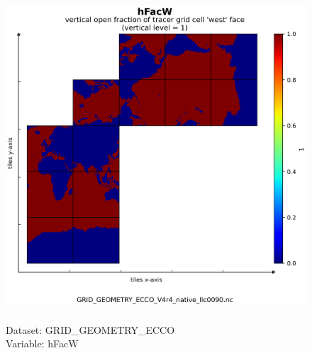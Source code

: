 \begin{figure}[H]
\centering
\includegraphics[scale=0.5]{../images/plots/native_plots_coords/Geometry_Parameters_for_the_Lat-Lon-Cap_90_(llc90)_Native_Model_Grid_(Version_4_Release_4)/hFacW.png}
\caption{\\Dataset: GRID\_GEOMETRY\_ECCO\\Variable: hFacW}
\label{tab:table-GRID_GEOMETRY_ECCO_hFacW-Plot}
\end{figure}
\pagebreak
